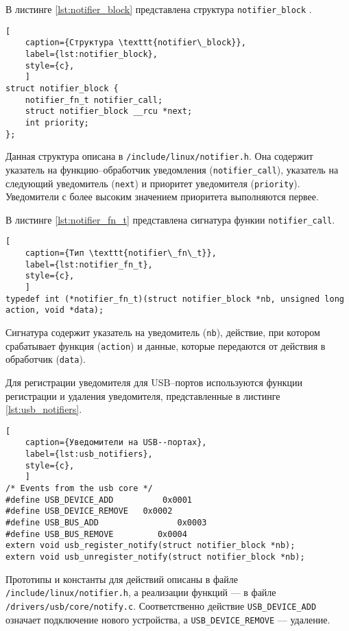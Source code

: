 В листинге \ref{lst:notifier_block} представлена структура \texttt{notifier\_block} \cite{notifier_block}.

\begin{lstlisting}[
	caption={Структура \texttt{notifier\_block}},
	label={lst:notifier_block},
	style={c},
	]
struct notifier_block {
	notifier_fn_t notifier_call;
	struct notifier_block __rcu *next;
	int priority;
};
\end{lstlisting}

Данная структура описана в \texttt{/include/linux/notifier.h}. Она содержит указатель на функцию--обработчик уведомления (\texttt{notifier\_call}), указатель на следующий уведомитель (\texttt{next}) и приоритет уведомителя (\texttt{priority}). Уведомители с более высоким значением приоритета выполняются первее.

В листинге \ref{lst:notifier_fn_t} представлена сигнатура функии \texttt{notifier\_call}.

\begin{lstlisting}[
	caption={Тип \texttt{notifier\_fn\_t}},
	label={lst:notifier_fn_t},
	style={c},
	]
typedef	int (*notifier_fn_t)(struct notifier_block *nb, unsigned long action, void *data);
\end{lstlisting}

Сигнатура содержит указатель на уведомитель (\texttt{nb}), действие, при котором срабатывает функция (\texttt{action}) и данные, которые передаются от действия в обработчик (\texttt{data}).

\newpage
Для регистрации уведомителя для USB--портов используются функции регистрации и удаления уведомителя, представленные в листинге \ref{lst:usb_notifiers}.

\begin{lstlisting}[
	caption={Уведомители на USB--портах},
	label={lst:usb_notifiers},
	style={c},
	]
/* Events from the usb core */
#define USB_DEVICE_ADD		    0x0001
#define USB_DEVICE_REMOVE	0x0002
#define USB_BUS_ADD		           0x0003
#define USB_BUS_REMOVE		   0x0004
extern void usb_register_notify(struct notifier_block *nb);
extern void usb_unregister_notify(struct notifier_block *nb);
\end{lstlisting}

Прототипы и константы для действий описаны в файле\\ \texttt{/include/linux/notifier.h}, а реализации функций --- в файле\\ \texttt{/drivers/usb/core/notify.c}. Соответственно действие \texttt{USB\_DEVICE\_ADD} означает подключение нового устройства, а \texttt{USB\_DEVICE\_REMOVE} --- удаление.

